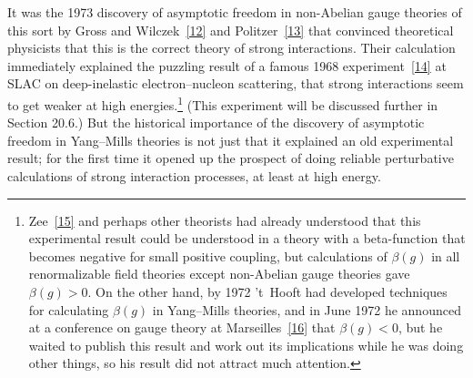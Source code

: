 It was the 1973 discovery of asymptotic freedom in non-Abelian gauge theories of this sort by Gross and Wilczek~\hyperref[ch18-ref-12]{[12]} and Politzer~\hyperref[ch18-ref-13]{[13]} that convinced theoretical physicists that this is the correct theory of strong interactions. Their calculation immediately explained the puzzling result of a famous 1968 experiment~\hyperref[ch18-ref-14]{[14]} at SLAC on deep-inelastic electron--nucleon scattering, that strong interactions seem to get weaker at high energies.\footnote{Zee~\hyperref[ch18-ref-15]{[15]} and perhaps other theorists had already understood that this experimental result could be understood in a theory with a beta-function that becomes negative for small positive coupling, but calculations of $\beta(g)$ in all renormalizable field theories except non-Abelian gauge theories gave $\beta(g)>0$. On the other hand, by 1972 't~Hooft had developed techniques for calculating $\beta(g)$ in Yang--Mills theories, and in June 1972 he announced at a conference on gauge theory at Marseilles~\hyperref[ch18-ref-16]{[16]} that $\beta(g)<0$, but he waited to publish this result and work out its implications while he was doing other things, so his result did not attract much attention.} (This experiment will be discussed further in Section 20.6.) But the historical importance of the discovery of asymptotic freedom in Yang--Mills theories is not just that it explained an old experimental result; for the first time it opened up the prospect of doing reliable perturbative calculations of strong interaction processes, at least at high energy.

